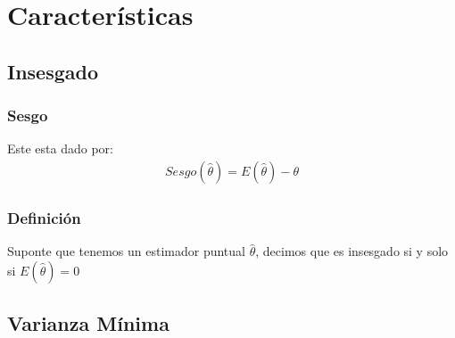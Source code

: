 \documentclass[12pt, fleqn]{report}                             %
\theoremstyle{break}                                            %
\begin{document}
        \section{Características}  

            \vspace{1em}
            \subsection{Insesgado}

                \vspace{1em}
                \subsubsection{Sesgo}

                    Este esta dado por:
                    \begin{align*}
                        Sesgo(\hat \theta) = E(\hat \theta)  - \theta
                    \end{align*}

                \vspace{1em}
                \subsubsection{Definición}

                    Suponte que tenemos un estimador puntual $\hat \theta$, decimos
                    que es insesgado si y solo si $E(\hat \theta) = 0$

            \vspace{2em}
            \subsection{Varianza Mínima}
\end{document}
